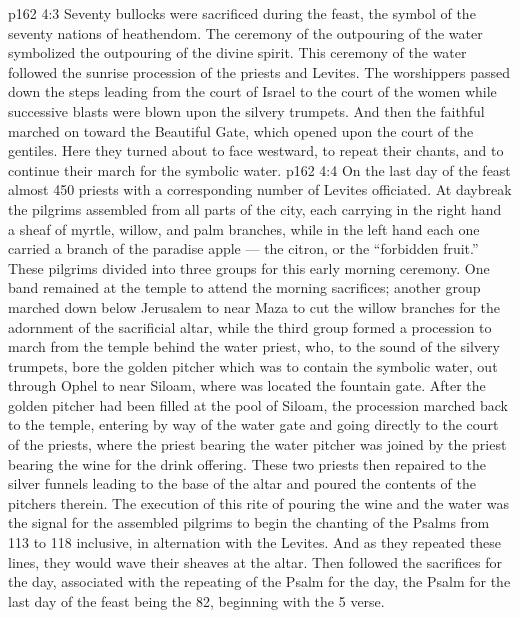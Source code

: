 \vs p162 4:3 Seventy bullocks were sacrificed during the feast, the symbol of the seventy nations of heathendom. The ceremony of the outpouring of the water symbolized the outpouring of the divine spirit. This ceremony of the water followed the sunrise procession of the priests and Levites. The worshippers passed down the steps leading from the court of Israel to the court of the women while successive blasts were blown upon the silvery trumpets. And then the faithful marched on toward the Beautiful Gate, which opened upon the court of the gentiles. Here they turned about to face westward, to repeat their chants, and to continue their march for the symbolic water.
\vs p162 4:4 \pc On the last day of the feast almost 450 priests with a corresponding number of Levites officiated. At daybreak the pilgrims assembled from all parts of the city, each carrying in the right hand a sheaf of myrtle, willow, and palm branches, while in the left hand each one carried a branch of the paradise apple --- the citron, or the “forbidden fruit.” These pilgrims divided into three groups for this early morning ceremony. One band remained at the temple to attend the morning sacrifices; another group marched down below Jerusalem to near Maza to cut the willow branches for the adornment of the sacrificial altar, while the third group formed a procession to march from the temple behind the water priest, who, to the sound of the silvery trumpets, bore the golden pitcher which was to contain the symbolic water, out through Ophel to near Siloam, where was located the fountain gate. After the golden pitcher had been filled at the pool of Siloam, the procession marched back to the temple, entering by way of the water gate and going directly to the court of the priests, where the priest bearing the water pitcher was joined by the priest bearing the wine for the drink offering. These two priests then repaired to the silver funnels leading to the base of the altar and poured the contents of the pitchers therein. The execution of this rite of pouring the wine and the water was the signal for the assembled pilgrims to begin the chanting of the Psalms from 113 to 118 inclusive, in alternation with the Levites. And as they repeated these lines, they would wave their sheaves at the altar. Then followed the sacrifices for the day, associated with the repeating of the Psalm for the day, the Psalm for the last day of the feast being the 82, beginning with the 5 verse.
